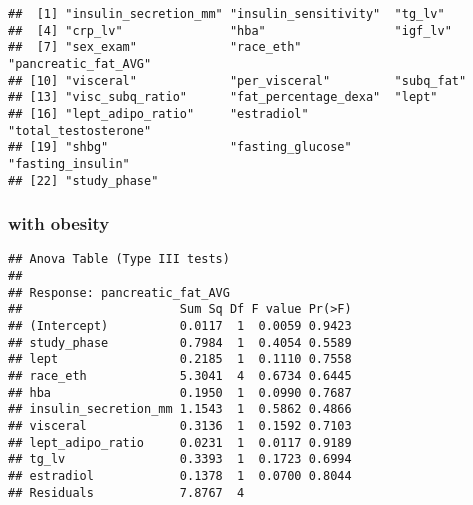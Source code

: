 \documentclass[
]{article}
\begin{document}
\begin{verbatim}
##  [1] "insulin_secretion_mm" "insulin_sensitivity"  "tg_lv"               
##  [4] "crp_lv"               "hba"                  "igf_lv"              
##  [7] "sex_exam"             "race_eth"             "pancreatic_fat_AVG"  
## [10] "visceral"             "per_visceral"         "subq_fat"            
## [13] "visc_subq_ratio"      "fat_percentage_dexa"  "lept"                
## [16] "lept_adipo_ratio"     "estradiol"            "total_testosterone"  
## [19] "shbg"                 "fasting_glucose"      "fasting_insulin"     
## [22] "study_phase"
\end{verbatim}

\hypertarget{with-obesity-1}{%
\subsubsection{with obesity}\label{with-obesity-1}}

\begin{verbatim}
## Anova Table (Type III tests)
## 
## Response: pancreatic_fat_AVG
##                      Sum Sq Df F value Pr(>F)
## (Intercept)          0.0117  1  0.0059 0.9423
## study_phase          0.7984  1  0.4054 0.5589
## lept                 0.2185  1  0.1110 0.7558
## race_eth             5.3041  4  0.6734 0.6445
## hba                  0.1950  1  0.0990 0.7687
## insulin_secretion_mm 1.1543  1  0.5862 0.4866
## visceral             0.3136  1  0.1592 0.7103
## lept_adipo_ratio     0.0231  1  0.0117 0.9189
## tg_lv                0.3393  1  0.1723 0.6994
## estradiol            0.1378  1  0.0700 0.8044
## Residuals            7.8767  4
\end{verbatim}
\end{document}
